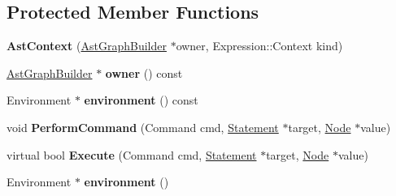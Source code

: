 \subsection*{Protected Member Functions}
\begin{DoxyCompactItemize}
\item 
{\bfseries Ast\+Context} (\hyperlink{classv8_1_1internal_1_1compiler_1_1_ast_graph_builder}{Ast\+Graph\+Builder} $\ast$owner, Expression\+::\+Context kind)\hypertarget{classv8_1_1internal_1_1compiler_1_1_b_a_s_e___e_m_b_e_d_d_e_d_a522cfb3974b5e9cb54dbb9ed71980234}{}\label{classv8_1_1internal_1_1compiler_1_1_b_a_s_e___e_m_b_e_d_d_e_d_a522cfb3974b5e9cb54dbb9ed71980234}

\item 
\hyperlink{classv8_1_1internal_1_1compiler_1_1_ast_graph_builder}{Ast\+Graph\+Builder} $\ast$ {\bfseries owner} () const \hypertarget{classv8_1_1internal_1_1compiler_1_1_b_a_s_e___e_m_b_e_d_d_e_d_ae6e17d11c0d9eafae1b1362da50e8ccc}{}\label{classv8_1_1internal_1_1compiler_1_1_b_a_s_e___e_m_b_e_d_d_e_d_ae6e17d11c0d9eafae1b1362da50e8ccc}

\item 
Environment $\ast$ {\bfseries environment} () const \hypertarget{classv8_1_1internal_1_1compiler_1_1_b_a_s_e___e_m_b_e_d_d_e_d_a0ab2a8af7fad8f660d08f510bd0676d7}{}\label{classv8_1_1internal_1_1compiler_1_1_b_a_s_e___e_m_b_e_d_d_e_d_a0ab2a8af7fad8f660d08f510bd0676d7}

\item 
void {\bfseries Perform\+Command} (Command cmd, \hyperlink{classv8_1_1internal_1_1_statement}{Statement} $\ast$target, \hyperlink{classv8_1_1internal_1_1compiler_1_1_node}{Node} $\ast$value)\hypertarget{classv8_1_1internal_1_1compiler_1_1_b_a_s_e___e_m_b_e_d_d_e_d_a6a3c4d0c33f73a75a9a0a38a108aaa58}{}\label{classv8_1_1internal_1_1compiler_1_1_b_a_s_e___e_m_b_e_d_d_e_d_a6a3c4d0c33f73a75a9a0a38a108aaa58}

\item 
virtual bool {\bfseries Execute} (Command cmd, \hyperlink{classv8_1_1internal_1_1_statement}{Statement} $\ast$target, \hyperlink{classv8_1_1internal_1_1compiler_1_1_node}{Node} $\ast$value)\hypertarget{classv8_1_1internal_1_1compiler_1_1_b_a_s_e___e_m_b_e_d_d_e_d_a22d8bea34180c056d44b64bf4f05846d}{}\label{classv8_1_1internal_1_1compiler_1_1_b_a_s_e___e_m_b_e_d_d_e_d_a22d8bea34180c056d44b64bf4f05846d}

\item 
Environment $\ast$ {\bfseries environment} ()\hypertarget{classv8_1_1internal_1_1compiler_1_1_b_a_s_e___e_m_b_e_d_d_e_d_a7da118bbd77611d1a18b4841d3ff70f8}{}\label{classv8_1_1internal_1_1compiler_1_1_b_a_s_e___e_m_b_e_d_d_e_d_a7da118bbd77611d1a18b4841d3ff70f8}


\end{DoxyCompactItemize}
